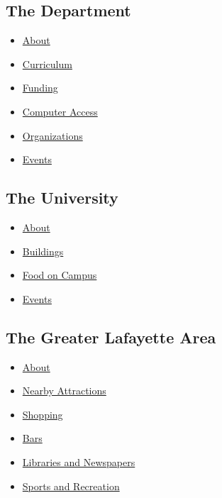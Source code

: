 \documentclass[letterpaper,twocolumn,10pt]{article}
\begin{document}
{\subsection*{The Department}
\begin{itemize}
  \item \href{https://www.cs.purdue.edu/gsb/doku.php?id=survival_guide:about_the_department}{About}
  \item \href{https://www.cs.purdue.edu/gsb/doku.php?id=survival_guide:curriculum}{Curriculum}
  \item \href{https://www.cs.purdue.edu/gsb/doku.php?id=survival_guide:funding}{Funding}
  \item \href{https://www.cs.purdue.edu/gsb/doku.php?id=survival_guide:computer_access}{Computer Access}
  \item \href{https://www.cs.purdue.edu/gsb/doku.php?id=survival_guide:student_orgs}{Organizations}
  \item \href{https://www.cs.purdue.edu/gsb/doku.php?id=survival_guide:department_events}{Events}
\end{itemize}

\subsection*{The University}
\begin{itemize}
  \item \href{https://www.cs.purdue.edu/gsb/doku.php?id=survival_guide:about_the_university}{About}
  \item \href{https://www.cs.purdue.edu/gsb/doku.php?id=survival_guide:university_buildings}{Buildings}
  \item \href{https://www.cs.purdue.edu/gsb/doku.php?id=survival_guide:university_food}{Food on Campus}
  \item \href{https://www.cs.purdue.edu/gsb/doku.php?id=survival_guide:university_events}{Events}
 \end{itemize}

\subsection*{The Greater Lafayette Area}
\begin{itemize}
  \item \href{https://www.cs.purdue.edu/gsb/doku.php?id=survival_guide:about_lafayette}{About}
  \item \href{https://www.cs.purdue.edu/gsb/doku.php?id=survival_guide:lafayette_attractions}{Nearby Attractions}
  \item \href{https://www.cs.purdue.edu/gsb/doku.php?id=survival_guide:lafayette_shopping}{Shopping}
  \item \href{https://www.cs.purdue.edu/gsb/doku.php?id=survival_guide:bars}{Bars}
  \item \href{https://www.cs.purdue.edu/gsb/doku.php?id=survival_guide:lafayette_newspapers_and_libraries}{Libraries and Newspapers}
  \item \href{https://www.cs.purdue.edu/gsb/doku.php?id=survival_guide:lafayette_recreation}{Sports and Recreation}
\end{itemize}

}
\end{document}
